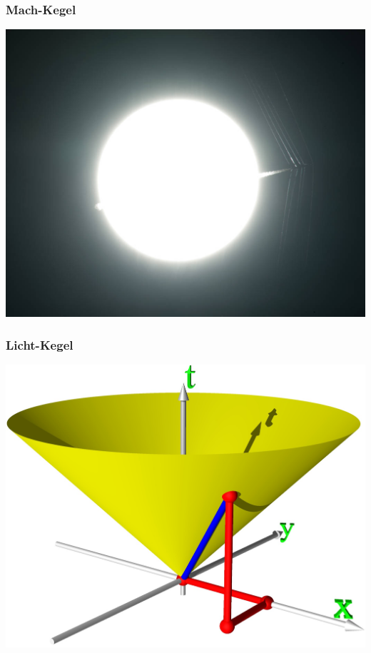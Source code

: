 \documentclass[handout]{beamer}
\begin{document}
\begin{frame}
\frametitle{Mach-Kegel}
\begin{center}
\includegraphics[width=\hsize]{afrc.jpg}
\end{center}
\end{frame}

\begin{frame}
\frametitle{Licht-Kegel}
\begin{center}
\includegraphics[width=\hsize]{lichtkegel.jpg}
\end{center}
\end{frame}
\end{document}
